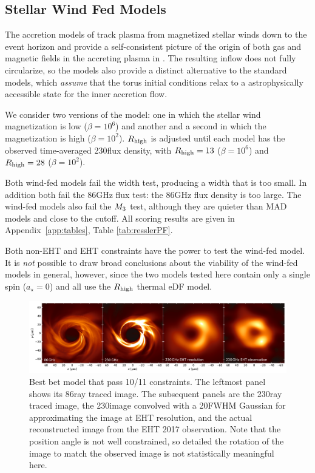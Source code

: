 \subsection{Stellar Wind Fed Models}

The accretion models of \cite{2020ApJ...896L...6R, 2020MNRAS.492.3272R, 2018MNRAS.478.3544R} track plasma from  magnetized stellar winds down to the event horizon and provide a self-consistent picture of the origin of both gas and magnetic fields in the accreting plasma in \sgra.  The resulting inflow does not fully circularize, so the models also provide a distinct alternative to the standard models, which {\em assume} that the torus initial conditions relax to a astrophysically accessible state for the inner accretion flow.

We consider two versions of the model: one in which the stellar wind magnetization is low ($\beta = 10^6$) and another and a second in which the magnetization is high ($\beta = 10^2$). $R_\mathrm{high}$ is adjusted until each model has the observed time-averaged 230\GHz flux density, with $R_\mathrm{high} = 13$ ($\beta = 10^6$) and $R_\mathrm{high} = 28$ ($\beta = 10^2$).

Both wind-fed models fail the \mring width test, producing a width that is too small.  In addition both fail the 86GHz flux test: the 86GHz flux density is too large.  The wind-fed models also fail the $M_{3}$ test, although they are quieter than MAD models and close to the cutoff.   All scoring results are given in Appendix~\ref{app:tables}, Table \ref{tab:resslerPF}.

Both non-EHT and EHT constraints have the power to test the wind-fed model.  It is {\em not} possible to draw broad conclusions about the viability of the wind-fed models in general, however, since the two models tested here contain only a single spin ($a_\star=0$) and all use the $R_\mathrm{high}$ thermal eDF model.

\begin{figure}
  \centering
  \includegraphics[width=\textwidth]{figures/bestbet_imgs.pdf}
  \caption{Best bet model that pass 10/11 constraints.
    The leftmost panel shows its 86\GHz ray traced image.
    The subsequent panels are the 230\GHz ray traced image,
    the 230\GHz image convolved with a 20\uas FWHM Gaussian for approximating the image at EHT resolution, and
    the actual reconstructed image from the EHT 2017 observation.
    Note that the position angle is not well constrained, so detailed the rotation of the image to match the observed image is not statistically meaningful here.}
  \label{fig:bestbet_imgs}
\end{figure}

